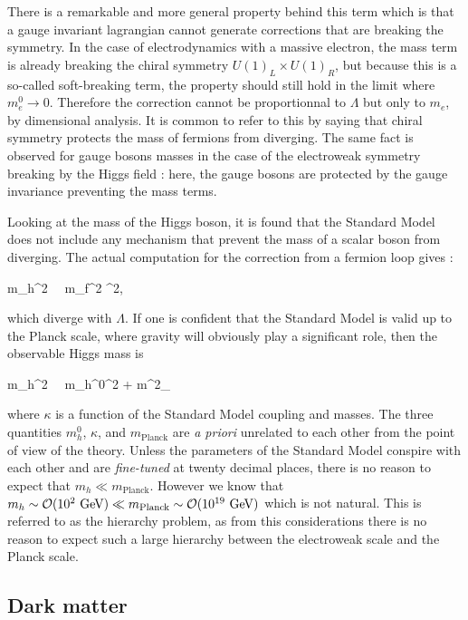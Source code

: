     There is a remarkable and more general property behind this term which is that a
    gauge invariant lagrangian cannot generate corrections that are breaking the symmetry. In
    the case of electrodynamics with a massive electron, the mass term is already breaking
    the chiral symmetry $U(1)_L \times U(1)_R$, but because this is a so-called soft-breaking
    term, the property should still hold in the limit where $m_e^0 \rightarrow 0$.
    Therefore the correction cannot be proportionnal to $\Lambda$ but only to $m_e$, by
    dimensional analysis. It is common to refer to this by saying that chiral symmetry
    protects the mass of fermions from diverging. The same fact is observed for gauge
    bosons masses in the case of the electroweak symmetry breaking by the Higgs field :
    here, the gauge bosons are protected by the gauge invariance preventing the mass terms.

    Looking at the mass of the Higgs boson, it is found that the Standard Model does not include
    any mechanism that prevent the mass of a scalar boson from diverging. The actual
    computation for the correction from a fermion loop gives :

    {
        \Delta m_h^2 \, \propto \, m_f^2 \Lambda^2,
    }

    which diverge with $\Lambda$. If one is confident that the Standard Model is valid
    up to the Planck scale, where gravity will obviously play a significant role, then
    the observable Higgs mass is

    {
        m_h^2 \, \simeq \, {m_h^0}^2 + \kappa \cdot m^2_
    }

    where $\kappa$ is a function of the Standard Model coupling and masses. The
    three quantities $m_h^0$, $\kappa$, and $m_\text{Planck}$ are \emph{a priori} unrelated
    to each other from the point of view of the theory. Unless the parameters of the
    Standard Model conspire with each other and are \emph{fine-tuned} at twenty decimal
    places, there is no reason to expect that $m_h \ll m_\text{Planck}$. However we know
    that $m_h \sim \mathcal{O}(10^2~\text{GeV}) \ll m_\text{Planck} \sim \mathcal{O}(10^{19}~\text{GeV})$ which
    is not natural. This is referred to as the hierarchy problem, as from this considerations
    there is no reason to expect such a large hierarchy between the electroweak scale and
    the Planck scale.

        \subsection{Dark matter}

